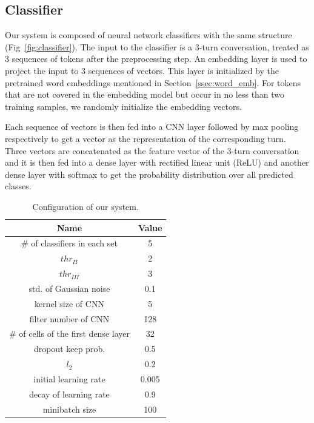 \documentclass[11pt,a4paper]{article}
\begin{document}
\subsection{Classifier}

Our system is composed of neural network classifiers with the same structure (Fig~\ref{fig:classifier}). The input to the classifier is a 3-turn conversation, treated as 3 sequences of tokens after the preprocessing step. An embedding layer is used to project the input to 3 sequences of vectors. This layer is initialized by the pretrained word embeddings mentioned in Section~\ref{ssec:word_emb}. For tokens that are not covered in the embedding model but occur in no less than two training samples, we randomly initialize the embedding vectors.

Each sequence of vectors is then fed into a CNN layer followed by max pooling respectively to get a vector as the representation of the corresponding turn. Three vectors are concatenated as the feature vector of the 3-turn conversation and it is then fed into a dense layer with rectified linear unit (ReLU) and another dense layer with softmax to get the probability distribution over all predicted classes.

\begin{table}\small
\begin{center}
\begin{tabular}{c|c}
\hline
\bf Name & \bf Value \\ 
\hline
\# of classifiers in each set  & 5 \\
$thr_{II}$ & 2  \\
$thr_{III}$ & 3 \\
\hline
std. of Gaussian noise & 0.1 \\
kernel size of CNN  & 5 \\
filter number of CNN & 128 \\
\# of cells of the first dense layer & 32 \\
dropout keep prob. & 0.5 \\
\em $l_2$ & 0.2 \\
initial learning rate & 0.005 \\
decay of learning rate & 0.9 \\
minibatch size & 100 \\
\hline
\end{tabular}
\end{center}
\caption{\label{tab:hyper_param} Configuration of our system.}
\end{table}
\end{document}
